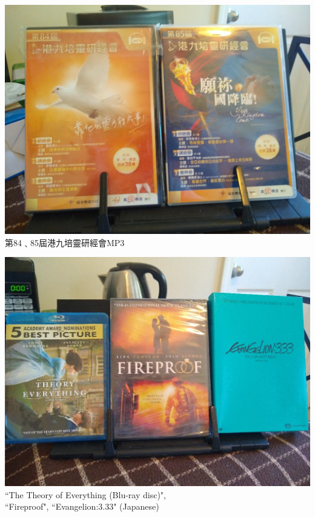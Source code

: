 \documentclass[t]{beamer}
\newcommand{\htarget}[2]{\hypertarget{#1}{#2}}
\begin{document}
\begin{frame}\htarget{hongkong}{} \begin{center}
\includegraphics[height=0.8\textheight]{dvd04_mini.jpg} \\
第84﹑85屆港九培靈研經會MP3
\end{center} \end{frame}
\begin{frame}\htarget{theory}{} \begin{center}
\includegraphics[height=0.8\textheight]{dvd05_mini.jpg} \\
``The Theory of Everything (Blu-ray disc)", \\
``Fireproof", ``Evangelion:3.33" (Japanese)
\end{center} \end{frame}
\end{document}
